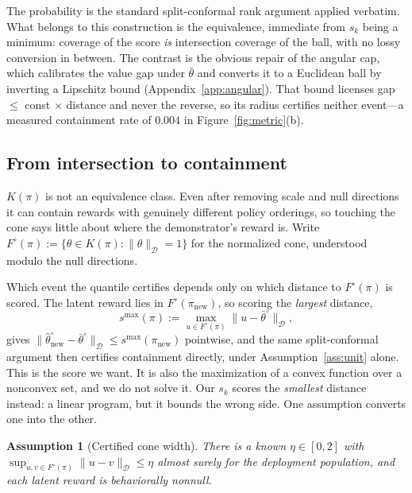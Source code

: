 \documentclass{article}
\newtheorem{assumption}{Assumption}
\newcommand{\Dnorm}[1]{\|#1\|_{\mathcal D}}
\begin{document}
The probability is the standard split-conformal rank argument
\citep{vovk2005algorithmic} applied verbatim. What belongs to this construction
is the equivalence, immediate from $s_k$ being a minimum: coverage of the score
\emph{is} intersection coverage of the ball, with no lossy conversion in
between. The contrast is the obvious repair of the angular cap, which
calibrates the value gap under $\bar\theta$ and converts it to a Euclidean ball
by inverting a Lipschitz bound (Appendix~\ref{app:angular}). That bound
licenses gap $\le$ const $\times$ distance and never the reverse, so its radius
certifies neither event---a measured containment rate of $0.004$ in
Figure~\ref{fig:metric}(b).

\subsection{From intersection to containment}
\label{sec:stage2}

$K(\pi)$ is not an equivalence class. Even after removing scale and null
directions it can contain rewards with genuinely different policy orderings, so
touching the cone says little about where the demonstrator's reward is. Write
$F^\circ(\pi):=\{\theta\in K(\pi):\Dnorm{\theta}=1\}$ for the normalized cone,
understood modulo the null directions.

Which event the quantile certifies depends only on which distance to
$F^\circ(\pi)$ is scored. The latent reward lies in
$F^\circ(\pi_{\mathrm{new}})$, so scoring the \emph{largest} distance,
\[
s^{\max}(\pi):=\max_{u\in F^\circ(\pi)}\Dnorm{u-\bar\theta^\circ},
\]
gives $\Dnorm{\hat\theta_{\mathrm{new}}^\circ-\bar\theta^\circ}\le
s^{\max}(\pi_{\mathrm{new}})$ pointwise, and the same split-conformal argument
then certifies containment directly, under Assumption~\ref{ass:unit} alone.
This is the score we want. It is also the maximization of a convex function
over a nonconvex set, and we do not solve it. Our $s_k$ scores the
\emph{smallest} distance instead: a linear program, but it bounds the wrong
side. One assumption converts one into the other.

\begin{assumption}[Certified cone width]
\label{ass:cone-width}
There is a known $\eta\in[0,2]$ with
$\sup_{u,v\in F^\circ(\pi)}\Dnorm{u-v}\le\eta$ almost surely for the deployment
population, and each latent reward is behaviorally nonnull.
\end{assumption}
\end{document}
